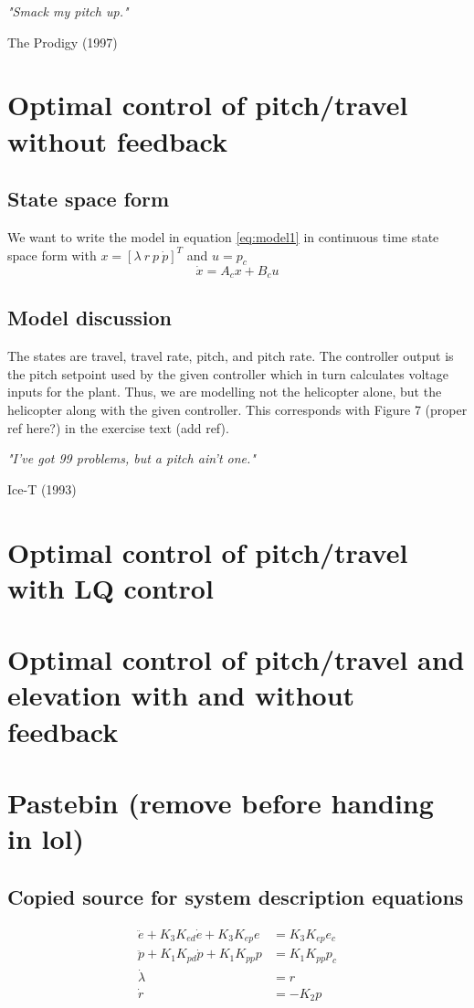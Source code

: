 \documentclass[a4paper,12pt]{article}
\numberwithin{equation}{subsection}
\begin{document}
\tableofcontents

\newpage
\epigraph{\textit{"Smack my pitch up."}}{The Prodigy (1997)}
\section{Optimal control of pitch/travel without feedback}
\subsection{State space form}
We want to write the model in equation \ref{eq:model1} in continuous time state space form with $x = \left[ \lambda\  r\  p\  \dot{p}\right]^T$ and $u=p_c$
\begin{equation}\label{eq:model1}
\dot{x}=A_cx+B_cu
\end{equation}
\subsection{Model discussion}
The states are travel, travel rate, pitch, and pitch rate. The controller output is the pitch setpoint used by the given controller which in turn calculates voltage inputs for the plant. Thus, we are modelling not the helicopter alone, but the helicopter along with the given controller. This corresponds with Figure 7 (proper ref here?) in the exercise text (add ref).

\newpage
\epigraph{\textit{"I've got 99 problems, but a pitch ain't one."}}{Ice-T (1993)}
\section{Optimal control of pitch/travel with LQ control}
\newpage
\section{Optimal control of pitch/travel and elevation with and without feedback}
\newpage
\section{Pastebin (remove before handing in lol)}

\subsection{Copied source for system description equations}
\begin{subequations}
\label{eq:model_al}
\begin{align}
	\ddot{e} + K_{3} K_{ed} \dot{e} + K_{3} K_{ep} e &= K_{3} K_{ep} e_{c} \label{eq:model_se_al_elev} \\
	\ddot{p} + K_{1} K_{pd} \dot{p} + K_{1} K_{pp} p &= K_{1} K_{pp} p_{c} \label{eq:model_se_al_pitch} \\
	\dot{\lambda} &= r \label{eq:model_se_al_lambda} \\
	\dot{r} &= -K_{2} p \label{eq:model_se_al_r} 
\end{align}
\end{subequations}
\end{document}

